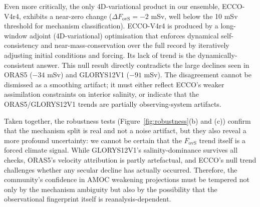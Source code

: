 \documentclass[11pt,a4paper]{article}
\begin{document}
Even more critically, the only 4D-variational product in our ensemble, ECCO-V4r4, exhibits a near-zero change (\(\Delta F_{\mathrm{ovS}} = -2\) mSv, well below the 10 mSv threshold for mechanism classification). ECCO-V4r4 is produced by a long-window adjoint (4D-variational) optimisation that enforces dynamical self-consistency and near-mass-conservation over the full record by iteratively adjusting initial conditions and forcing. Its lack of trend is the dynamically-consistent answer. This null result directly contradicts the large declines seen in ORAS5 (\(-34\) mSv) and GLORYS12V1 (\(-91\) mSv). The disagreement cannot be dismissed as a smoothing artifact; it must either reflect ECCO's weaker assimilation constraints on interior salinity, or indicate that the ORAS5/GLORYS12V1 trends are partially observing-system artifacts.

Taken together, the robustness tests (Figure~\ref{fig:robustness}(b) and (c)) confirm that the mechanism split is real and not a noise artifact, but they also reveal a more profound uncertainty: we cannot be certain that the \(F_{\mathrm{ovS}}\) trend itself is a forced climate signal. While GLORYS12V1's salinity-dominance survives all checks, ORAS5's velocity attribution is partly artefactual, and ECCO's null trend challenges whether any secular decline has actually occurred. Therefore, the community's confidence in AMOC weakening projections must be tempered not only by the mechanism ambiguity but also by the possibility that the observational fingerprint itself is reanalysis-dependent.
\end{document}
